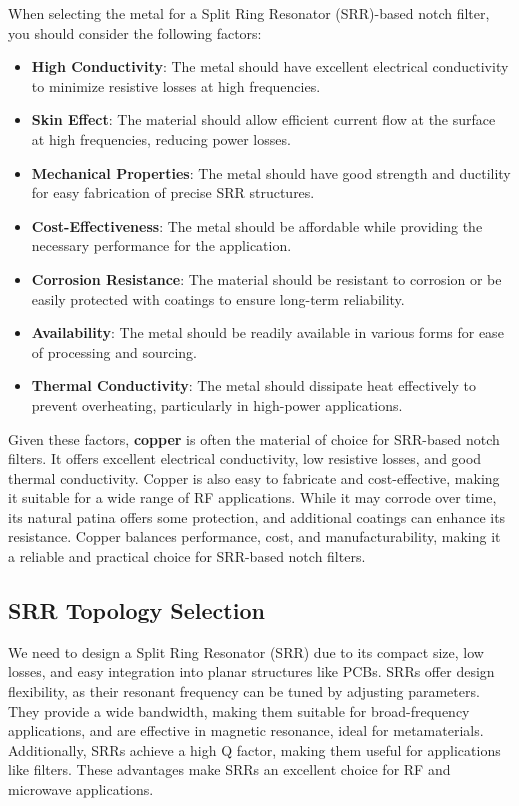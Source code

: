 \documentclass[conference]{IEEEtran}
\begin{document}
When selecting the metal for a Split Ring Resonator (SRR)-based notch filter, you should consider the following factors:

\begin{itemize}
    \item \textbf{High Conductivity}: The metal should have excellent electrical conductivity to minimize resistive losses at high frequencies.
    \item \textbf{Skin Effect}: The material should allow efficient current flow at the surface at high frequencies, reducing power losses.
    \item \textbf{Mechanical Properties}: The metal should have good strength and ductility for easy fabrication of precise SRR structures.
    \item \textbf{Cost-Effectiveness}: The metal should be affordable while providing the necessary performance for the application.
    \item \textbf{Corrosion Resistance}: The material should be resistant to corrosion or be easily protected with coatings to ensure long-term reliability.
    \item \textbf{Availability}: The metal should be readily available in various forms for ease of processing and sourcing.
    \item \textbf{Thermal Conductivity}: The metal should dissipate heat effectively to prevent overheating, particularly in high-power applications.
\end{itemize}

Given these factors, \textbf{copper} is often the material of choice for SRR-based notch filters. It offers excellent electrical conductivity, low resistive losses, and good thermal conductivity. Copper is also easy to fabricate and cost-effective, making it suitable for a wide range of RF applications. While it may corrode over time, its natural patina offers some protection, and additional coatings can enhance its resistance. Copper balances performance, cost, and manufacturability, making it a reliable and practical choice for SRR-based notch filters.

\subsection{SRR Topology Selection}
We need to design a Split Ring Resonator (SRR) due to its compact size, low losses, and easy integration into planar structures like PCBs. SRRs offer design flexibility, as their resonant frequency can be tuned by adjusting parameters. They provide a wide bandwidth, making them suitable for broad-frequency applications, and are effective in magnetic resonance, ideal for metamaterials. Additionally, SRRs achieve a high Q factor, making them useful for applications like filters. These advantages make SRRs an excellent choice for RF and microwave applications.
\end{document}
